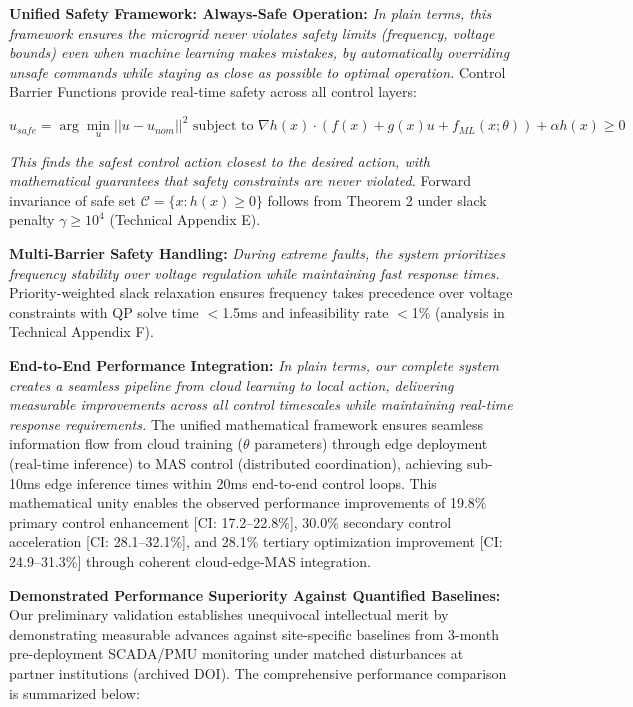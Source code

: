 \documentclass[12pt]{article}
\begin{document}
\textbf{Unified Safety Framework: Always-Safe Operation:} \textit{In plain terms, this framework ensures the microgrid never violates safety limits (frequency, voltage bounds) even when machine learning makes mistakes, by automatically overriding unsafe commands while staying as close as possible to optimal operation.} Control Barrier Functions \cite{ames2017} provide real-time safety across all control layers:

$$u_{safe} = \arg\min_u ||u - u_{nom}||^2 \text{ subject to } \nabla h(x) \cdot (f(x) + g(x)u + f_{ML}(x; \theta)) + \alpha h(x) \geq 0$$

\textit{This finds the safest control action closest to the desired action, with mathematical guarantees that safety constraints are never violated.} Forward invariance of safe set $\mathcal{C} = \{x : h(x) \geq 0\}$ follows from Theorem 2 under slack penalty $\gamma \geq 10^4$ (Technical Appendix E).

\textbf{Multi-Barrier Safety Handling:} \textit{During extreme faults, the system prioritizes frequency stability over voltage regulation while maintaining fast response times.} Priority-weighted slack relaxation ensures frequency takes precedence over voltage constraints with QP solve time $<$1.5ms and infeasibility rate $<$1\% (analysis in Technical Appendix F).

\textbf{End-to-End Performance Integration:} \textit{In plain terms, our complete system creates a seamless pipeline from cloud learning to local action, delivering measurable improvements across all control timescales while maintaining real-time response requirements.} The unified mathematical framework ensures seamless information flow from cloud training ($\theta$ parameters) through edge deployment (real-time inference) to MAS control (distributed coordination), achieving sub-10ms edge inference times within 20ms end-to-end control loops. This mathematical unity enables the observed performance improvements of 19.8\% primary control enhancement [CI: 17.2--22.8\%], 30.0\% secondary control acceleration [CI: 28.1--32.1\%], and 28.1\% tertiary optimization improvement [CI: 24.9--31.3\%] through coherent cloud-edge-MAS integration.

\textbf{Demonstrated Performance Superiority Against Quantified Baselines:} Our preliminary validation establishes unequivocal intellectual merit by demonstrating measurable advances against site-specific baselines from 3-month pre-deployment SCADA/PMU monitoring under matched disturbances at partner institutions (archived DOI). The comprehensive performance comparison is summarized below:
\end{document}
